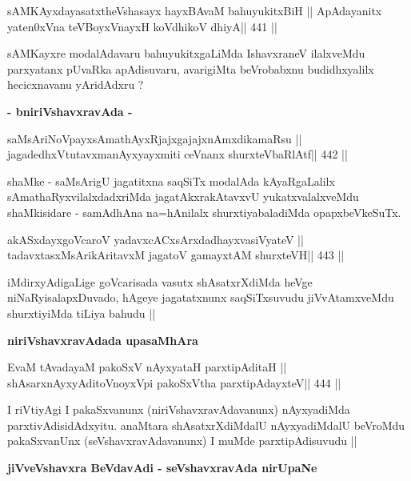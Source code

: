 \begin{shl}
sAMKAyxdayasatxtheVshasayx hayxBAvaM bahuyukitxBiH ||
ApAdayanitx yaten0xVna teVBoyxV\s nayxH koV\s dhikoV dhiyA\hfill || 441 ||
\end{shl}

\begin{artha}
sAMKayxre modalAdavaru bahuyukitxgaLiMda IshavxraneV ilalxveMdu
parxyatanx pUvaRka apAdisuvaru, avarigiMta beVrobabxnu budidhxyalilx
hecicxnavanu yAridAdxru ?
\end{artha}

\medskip
\centerline{\textbf{- bniriVshavxravAda -}}

\begin{shl}
saMsAriNoV\s payxsAmathAyxRjajxgajajxnAmxdikamaRsu ||
jagadedhxVtutavxmanAyxyayxmiti ceVnanx shurxteVbaRlAtf\hfill || 442 ||
\end{shl}

\begin{center}
shaMke - saMsArigU jagatitxna saqSiTx modalAda kAyaRgaLalilx
sAmathaRyxvilalxdadxriMda jagatAkxrakAtavxvU yukatxvalalxveMdu
shaMkisidare - samAdhAna na=hAnilalx shurxtiyabaladiMda opapxbeVkeSuTx.
\end{center}

\begin{shl}
akASxdayxgoVcaroV yadavxcACxsArxdadhayxvasiVyateV ||
tadavxtasxMsArikAritavxM jagatoV gamayxtAM shurxteVH\hfill || 443 ||
\end{shl}

\begin{center}
iMdirxyAdigaLige goVcarisada vasutx shAsatxrXdiMda heVge
niNaRyisalapxDuvado, hAgeye jagatatxnunx saqSiTxsuvudu jiVvAtamxveMdu
shurxtiyiMda tiLiya bahudu ||
\end{center}

\medskip
\centerline{\textbf{niriVshavxravAdada upasaMhAra}}

\begin{shl}
EvaM tAvadayaM pakoSxV nAyxyataH parxtipAditaH ||
shAsarxnAyxyAditoV\s noyxV\s pi pakoSxV\s tha parxtipAdayxteV\hfill || 444 ||
\end{shl}

\begin{center}
I riVtiyAgi I pakaSxvanunx (niriVshavxravAdavanunx) nAyxyadiMda
parxtivAdisidAdxyitu. anaMtara shAsatxrXdiMdalU nAyxyadiMdalU beVroMdu
pakaSxvanUnx (seVshavxravAdavanunx) I muMde parxtipAdisuvudu ||
\end{center}

\medskip
\centerline{\Large{\textbf{jiVveVshavxra BeVdavAdi - seVshavxravAda nirUpaNe}}}

